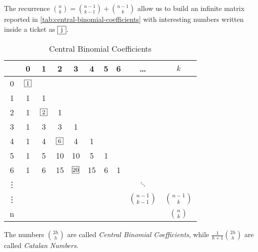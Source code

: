 The recurrence $ {{n}\choose{k}} = {{n-1}\choose{k-1}} +
{{n-1}\choose{k}}$ allow us to build an infinite matrix reported in
\autoref{tab:central-binomial-coefficients} with interesting numbers
written inside a ticket as $\ticket{j}$.
\begin{table}[ht]
  \caption{Central Binomial Coefficients}
  \label{tab:central-binomial-coefficients}
  \begin{center}
    \begin{tabular}{c|ccccccccc}
      & 0 & 1 & 2 & 3 & 4 & 5 & 6 & \ldots & $k$ \\
      \hline
      0 & $\ticket{1}$ &  &  &  & & &  &  &\\
      1 & 1 & 1 &  &  & & & && \\
      2 & 1 & $\ticket{2}$ & 1 &  & & & && \\
      3 & 1 & 3 & 3 & 1 &  & &&&  \\
      4 & 1 & 4 & $\ticket{6}$ & 4 & 1 & &&&  \\
      5 & 1 & 5 & 10 & 10 & 5 & 1&&&  \\
      6 & 1 & 6 & 15 & $\ticket{20}$ & 15 & 6& 1&&  \\
      \vdots&  &  &  &  &  & &&$\ddots$&  \\
      \vdots&  && & & & &  & ${{n-1}\choose{k-1}} $  & ${{n-1}\choose{k}} $  \\
      n&  &  & &  & &&  & & ${{n}\choose{k}} $ \\
    \end{tabular}
  \end{center}
\end{table}
The numbers ${{2h}\choose{h}}$ are called \emph{Central Binomial
  Coefficients}, while $ \frac{1}{h+1}{{2h}\choose{h}}$ are called
\emph{Catalan Numbers}.

